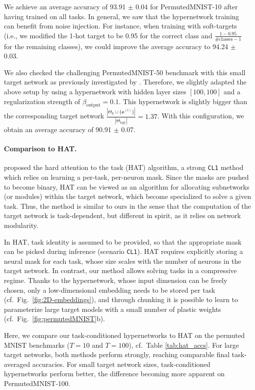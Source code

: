 \documentclass{article}
\begin{document}
We achieve an average accuracy of 93.91 $\pm$ 0.04 for PermutedMNIST-10 after having trained on all tasks. In general, we saw that the hypernetwork training can benefit from noise injection. For instance, when training with soft-targets (i.e., we modified the 1-hot target to be 0.95 for the correct class and $\frac{1-0.95}{\text{\# classes} - 1}$ for the remaining classes), we could improve the average accuracy to 94.24 $\pm$ 0.03.

We also checked the challenging PermutedMNIST-50 benchmark with this small target network as previously investigated by \citet{cl:kronecker:laplace}. Therefore, we slightly adapted the above setup by using a hypernetwork with hidden layer sizes $[100, 100]$ and a regularization strength of $\beta_\text{output} = 0.1$. This hypernetwork is slightly bigger than the corresponding target network $\frac{|\Theta_\text{h}\cup \{\mathbf{e}^{(t)} \}|}{|\Theta_\text{trgt}|} = 1.37$. With this configuration, we obtain an average accuracy of 90.91 $\pm$ 0.07.

\paragraph{Comparison to HAT.} \citet{pmlr-v80-serra18a} proposed the hard attention to the task (HAT) algorithm, a strong \texttt{CL1} method which relies on learning a per-task, per-neuron mask. Since the masks are pushed to become binary, HAT can be viewed as an algorithm for allocating subnetworks (or modules) within the target network, which become specialized to solve a given task. Thus, the method is similar to ours in the sense that the computation of the target network is task-dependent, but different in spirit, as it relies on network modularity.

In HAT, task identity is assumed to be provided, so that the appropriate mask can be picked during inference (scenario \texttt{CL1}). HAT requires explicitly storing a neural mask for each task, whose size scales with the number of neurons in the target network. In contrast, our method allows solving tasks in a compressive regime. Thanks to the hypernetwork, whose input dimension can be freely chosen, only a low-dimensional embedding needs to be stored per task (cf.~Fig.~\ref{fig:2D-embeddings}), and through chunking it is possible to learn to parameterize large target models with a small number of plastic weights (cf.~Fig.~\ref{fig:permutedMNIST}b).

Here, we compare our task-conditioned hypernetworks to HAT on the permuted MNIST benchmarks ($T=10$ and $T=100$), cf.~Table \ref{tab:hat_accs}. For large target networks, both methods perform strongly, reaching comparable final task-averaged accuracies. For small target network sizes, task-conditioned hypernetworks perform better, the difference becoming more apparent on PermutedMNIST-100.
\end{document}

